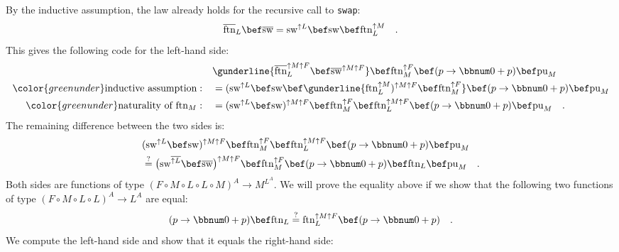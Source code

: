 By the inductive assumption, the law already holds for the recursive
call to \lstinline!swap!:
\[
\overline{\text{ftn}}_{L}\bef\overline{\text{sw}}=\text{sw}^{\uparrow L}\bef\text{sw}\bef\text{ftn}_{L}^{\uparrow M}\quad.
\]
This gives the following code for the left-hand side:
\begin{align*}
 & \gunderline{\overline{\text{ftn}}_{L}^{\uparrow M\uparrow F}\bef\overline{\text{sw}}^{\uparrow M\uparrow F}}\bef\text{ftn}_{M}^{\uparrow F}\bef(p\rightarrow\bbnum 0+p)\bef\text{pu}_{M}\\
{\color{greenunder}\text{inductive assumption}:}\quad & =(\text{sw}^{\uparrow L}\bef\text{sw}\bef\gunderline{\text{ftn}_{L}^{\uparrow M})^{\uparrow M\uparrow F}\bef\text{ftn}_{M}^{\uparrow F}}\bef(p\rightarrow\bbnum 0+p)\bef\text{pu}_{M}\\
{\color{greenunder}\text{naturality of }\text{ftn}_{M}:}\quad & =(\text{sw}^{\uparrow L}\bef\text{sw})^{\uparrow M\uparrow F}\bef\text{ftn}_{M}^{\uparrow F}\bef\text{ftn}_{L}^{\uparrow M\uparrow F}\bef(p\rightarrow\bbnum 0+p)\bef\text{pu}_{M}\quad.
\end{align*}
The remaining difference between the two sides is:
\begin{align*}
 & (\text{sw}^{\uparrow L}\bef\text{sw})^{\uparrow M\uparrow F}\bef\text{ftn}_{M}^{\uparrow F}\bef\text{ftn}_{L}^{\uparrow M\uparrow F}\bef(p\rightarrow\bbnum 0+p)\bef\text{pu}_{M}\\
 & \overset{?}{=}\big(\text{sw}^{\overline{\uparrow L}}\bef\overline{\text{sw}}\big)^{\uparrow M\uparrow F}\bef\text{ftn}_{M}^{\uparrow F}\bef(p\rightarrow\bbnum 0+p)\bef\text{ftn}_{L}\bef\text{pu}_{M}\quad.
\end{align*}
Both sides are functions of type $(F\circ M\circ L\circ L\circ M)^{A}\rightarrow M^{L^{A}}$.
We will prove the equality above if we show that the following two
functions of type $(F\circ M\circ L\circ L)^{A}\rightarrow L^{A}$
are equal:
\[
(p\rightarrow\bbnum 0+p)\bef\text{ftn}_{L}\overset{?}{=}\text{ftn}_{L}^{\uparrow M\uparrow F}\bef(p\rightarrow\bbnum 0+p)\quad.
\]
We compute the left-hand side and show that it equals the right-hand
side:
